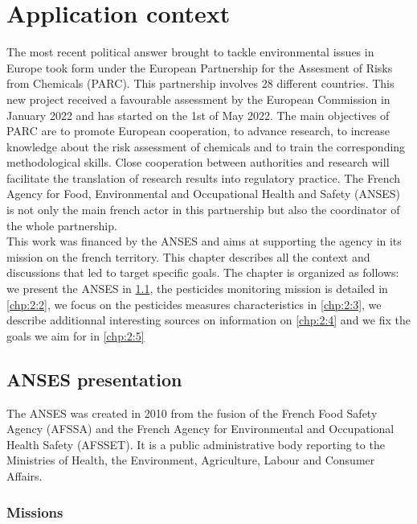 \chapter{Application context}\label{chp:2}

\minitoc

\clearpage

The most recent political answer brought to tackle environmental issues in Europe took form under the European Partnership for the Assesment of Risks from Chemicals (PARC). This partnership involves 28 different countries. This new project received a favourable assessment by the European Commission in January 2022 and has started on the 1st of May 2022. The main objectives of PARC are to promote European cooperation, to advance research, to increase knowledge about the risk assessment of chemicals and to train the corresponding methodological skills. Close cooperation between authorities and research will facilitate the translation of research results into regulatory practice. The French Agency for Food, Environmental and Occupational Health and Safety (ANSES) is not only the main french actor in this partnership but also the coordinator of the whole partnership. \\
This work was financed by the ANSES and aims at supporting the agency in its mission on the french territory. This chapter describes all the context and discussions that led to target specific goals. The chapter is organized as follows: we present the ANSES in \ref{chp:2:1}, the pesticides monitoring mission is detailed in \ref{chp:2:2}, we focus on the pesticides measures characteristics in \ref{chp:2:3}, we describe additionnal interesting sources on information on \ref{chp:2:4} and we fix the goals we aim for in \ref{chp:2:5}     

\section{ANSES presentation}\label{chp:2:1}

The ANSES was created in 2010 from the fusion of the French Food Safety Agency (AFSSA) and the French Agency for Environmental and Occupational Health Safety (AFSSET). It is a public administrative body reporting to the Ministries of Health, the Environment, Agriculture, Labour and Consumer Affairs.  

\subsection{Missions} 

